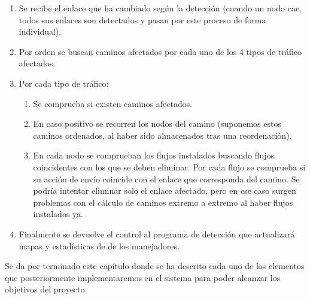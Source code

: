 \documentclass[a4paper,11pt]{book}
\begin{document}
\begin{enumerate}
\item Se recibe el enlace que ha cambiado según la detección (cuando un nodo cae, todos sus enlaces son detectados y pasan por este proceso de forma individual).
\item Por orden se buscan caminos afectados por cada uno de los 4 tipos de tráfico afectados.
\item Por cada tipo de tráfico:
\begin{enumerate}
\item Se comprueba si existen caminos afectados.
\item En caso positivo se recorren los nodos del camino (suponemos estos caminos ordenados, al haber sido almacenados tras una reordenación).
\item En cada nodo se comprueban los flujos instalados buscando flujos coincidentes con los que se deben eliminar. Por cada flujo se comprueba si su acción de envío coincide con el enlace que corresponda del camino. Se podría intentar eliminar solo el enlace afectado, pero en ese caso surgen problemas con el cálculo de caminos extremo a extremo al haber flujos instalados ya.
\end{enumerate}
\item Finalmente se devuelve el control al programa de detección que actualizará mapas y estadísticas de de los manejadores.
\end{enumerate}

Se da por terminado este capítulo donde se ha descrito cada uno de los elementos que posteriormente implementaremos en el sistema para poder alcanzar los objetivos del proyecto.
\end{document}

